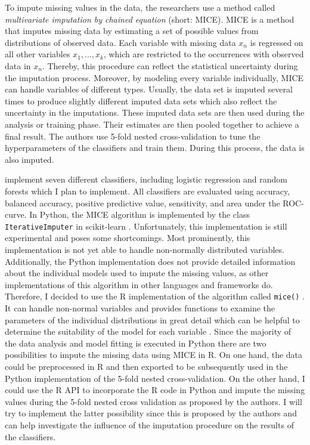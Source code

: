 \documentclass[12pt,a4paper,oneside]{article}
\newcommand{\code}{\texttt}
\begin{document}
To impute missing values in the data, the researchers use a method called \textit{multivariate imputation by chained equation} (short: MICE). MICE is a method that imputes missing data by estimating a set of possible values from distributions of observed data. Each variable with missing data $x_n$ is regressed on all other variables $x_1, ..., x_k$, which are restricted to the occurrences with observed data in $x_n$. Thereby, this procedure can reflect the statistical uncertainty during the imputation process. Moreover, by modeling every variable individually, MICE can handle variables of different types. Usually, the data set is imputed several times to produce slightly different imputed data sets which also reflect the uncertainty in the imputations. These imputed data sets are then used during the analysis or training phase. Their estimates are then pooled together to achieve a final result. \cite{RN141,RN142, RN144} The authors use 5-fold nested cross-validation to tune the hyperparameters of the classifiers and train them. During this process, the data is also imputed.
\par
\citeauthor{RN127} implement seven different classifiers, including logistic regression and random forests which I plan to implement. All classifiers are evaluated using accuracy, balanced accuracy, positive predictive value, sensitivity, and area under the ROC-curve.
In Python, the MICE algorithm is implemented by the class \code{IterativeImputer} in scikit-learn \cite{scikit-learn}. Unfortunately, this implementation is still experimental and poses some shortcomings. Most prominently, this implementation is not yet able to handle non-normally distributed variables. Additionally, the Python implementation does not provide detailed information about the individual models used to impute the missing values, as other implementations of this algorithm in other languages and frameworks do. Therefore, I decided to use the R implementation of the algorithm called \code{mice()} \cite{RN135}. It can handle non-normal variables and provides functions to examine the parameters of the individual distributions in great detail which can be helpful to determine the suitability of the model for each variable \cite{RN142}. Since the majority of the data analysis and model fitting is executed in Python there are two possibilities to impute the missing data using MICE in R. On one hand, the data could be preprocessed in R and then exported to be subsequently used in the Python implementation of the 5-fold nested cross-validation. 
On the other hand, I could use the R API to incorporate the R code in Python and impute the missing values during the 5-fold nested cross validation as proposed by the authors. I will try to implement the latter possibility since this is proposed by the authors and can help investigate the influence of the imputation procedure on the results of the classifiers.
\end{document}
